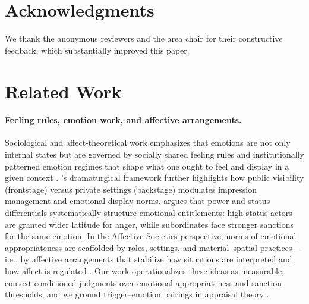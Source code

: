\documentclass[11pt]{article}
\begin{document}
\section*{Acknowledgments}
We thank the anonymous reviewers and the area chair for their constructive feedback, which substantially improved this paper.

%


\appendix


\section{Related Work}
\paragraph{Feeling rules, emotion work, and affective arrangements.}
Sociological and affect-theoretical work emphasizes that emotions are not only internal states but are governed by socially shared feeling rules and institutionally patterned emotion regimes that shape what one ought to feel and display in a given context \cite{hochschild1979emotionwork,russell2012managed,reddy2001navigationoffeeling,cummins2024feelingtherules}.
\citet{goffman2023presentation}'s dramaturgical framework further highlights how public visibility (frontstage) versus private settings (backstage) modulates impression management and emotional display norms.
\citet{kemper1978socialinteractional} argues that power and status differentials systematically structure emotional entitlements: high-status actors are granted wider latitude for anger, while subordinates face stronger sanctions for the same emotion.
In the Affective Societies perspective, norms of emotional appropriateness are scaffolded by roles, settings, and material--spatial practices---i.e., by affective arrangements that stabilize how situations are interpreted and how affect is regulated \cite{slaby2019affectivesocieties,slaby2019affectivearrangements,vonscheve2012emotionregulation}.
Our work operationalizes these ideas as measurable, context-conditioned judgments over emotional appropriateness and sanction thresholds, and we ground trigger--emotion pairings in appraisal theory \cite{lazarus1991emotionadaptation,scherer2005appraisalprocesses}.
\end{document}
